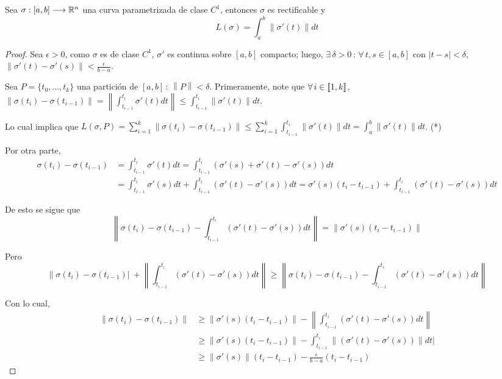 \begin{thm}

	Sea $\sigma: [a,b] \longrightarrow \mathbb{R}^n$ una curva parametrizada de clase $C^1$, entonces $\sigma$ es rectificable y \[ L( \sigma )= \int_a ^b \left\| \sigma' (t) \right\| dt   \]

\end{thm}



\begin{proof}

	Sea $\epsilon > 0$, como $ \sigma $ es de clase $C^1$, $ \sigma'$ es continua sobre $[a,b]$ compacto; luego, $\exists \, \delta > 0 \, : \, \forall \, t, s \in [a,b]$ con $|t-s| < \delta$, $\displaystyle \left\| \sigma' (t)- \sigma' (s) \right\| < \frac{\epsilon}{b-a}  $.

	Sea $P=\{ t_0, ..., t_k \}$ una partición de $[a,b] \, : \, \left\| P \right\| < \delta $. Primeramente, note que $ \forall \, i \in [\![1,k]\!]$, $\displaystyle \left\| \sigma (t_i)- \sigma (t_{i-1})  \right\|= \left\| \int_{t_{i-1}}^{t_i} \sigma' (t) dt  \right\| \le \int_{t_{i-1}}^{t_i} \left\|  \sigma' (t) \right\|  dt  $.

	Lo cual implica que $\displaystyle L( \sigma ,P)= \sum_{i=1}^k \left\| \sigma (t_i)- \sigma (t_{i-1}) \right\| \le \sum_{i=1}^k \int_{t_{i-1}} ^{t_i} \left\|  \sigma' (t) \right\|  dt = \int_a ^b  \left\|  \sigma' (t) \right\|  dt  $. (*)
	
	
	
	Por otra parte, 
	\begin{align*}
		\sigma(t_i)-\sigma(t_{i-1}) &= \int_{t_{i-1}}^{t_i} \sigma' (t)dt =\int_{t_{i-1}}^{t_i} (\sigma' (s)+\sigma' (t)-\sigma' (s))dt \\
		&=\int_{t_{i-1}}^{t_i} \sigma' (s)dt + \int_{t_{i-1}}^{t_i} (\sigma' (t)-\sigma' (s))dt = \sigma'(s) (t_i-t_{i-1})+ \int_{t_{i-1}}^{t_i} (\sigma' (t)-\sigma' (s))dt
	\end{align*}

	De esto se sigue que \[ \left\| \sigma(t_i)-\sigma(t_{i-1}) - \int_{t_{i-1}}^{t_i} (\sigma' (t)-\sigma' (s))dt \right\| = \left\| \sigma'(s) (t_i-t_{i-1}) \right\| \]
	
	Pero \[ \left\| \sigma(t_i)-\sigma(t_{i-1}) \right|\ + \left\| \int_{t_{i-1}}^{t_i} (\sigma' (t)-\sigma' (s))dt \right\| \ge \left\| \sigma(t_i)-\sigma(t_{i-1}) - \int_{t_{i-1}}^{t_i} (\sigma' (t)-\sigma' (s))dt \right\| \]
	
	Con lo cual,
	\begin{align*}
		\left\| \sigma(t_i)-\sigma(t_{i-1}) \right\| &\ge \left\| \sigma'(s) (t_i-t_{i-1}) \right\| - \left\| \int_{t_{i-1}}^{t_i} (\sigma' (t)-\sigma' (s))dt \right\| \\
		&\ge \left\| \sigma'(s) (t_i-t_{i-1}) \right\| -  \int_{t_{i-1}}^{t_i} \left\| (\sigma' (t)-\sigma' (s)) \right\| dt | \\
		&\ge \left\| \sigma'(s) \right\| (t_i-t_{i-1}) - \frac{\epsilon}{b-a} (t_i-t_{i-1})
	\end{align*}
	

\end{proof}
